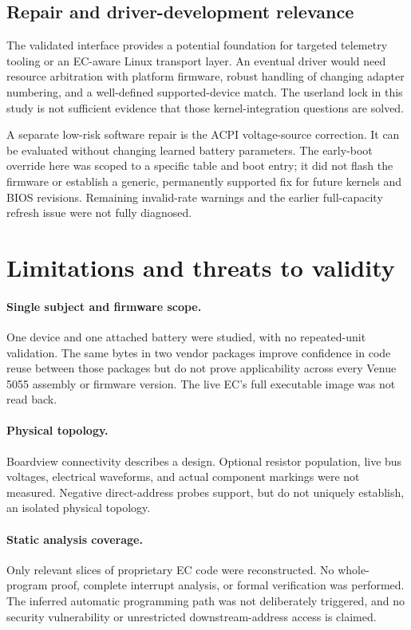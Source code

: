\documentclass[11pt,a4paper]{article}
\newcommand{\code}[1]{\texttt{\detokenize{#1}}}
\begin{document}
\subsection{Repair and driver-development relevance}
The validated interface provides a potential foundation for targeted telemetry tooling or an EC-aware Linux transport layer. An eventual driver would need resource arbitration with platform firmware, robust handling of changing adapter numbering, and a well-defined supported-device match. The userland lock in this study is not sufficient evidence that those kernel-integration questions are solved.

A separate low-risk software repair is the ACPI voltage-source correction. It can be evaluated without changing learned battery parameters. The early-boot override here was scoped to a specific table and boot entry; it did not flash the firmware or establish a generic, permanently supported fix for future kernels and BIOS revisions. Remaining invalid-rate warnings and the earlier full-capacity refresh issue were not fully diagnosed.

\section{Limitations and threats to validity}
\paragraph{Single subject and firmware scope.} One device and one attached battery were studied, with no repeated-unit validation. The same \code{@EC0} bytes in two vendor packages improve confidence in code reuse between those packages but do not prove applicability across every Venue 5055 assembly or firmware version. The live EC's full executable image was not read back.

\paragraph{Physical topology.} Boardview connectivity describes a design. Optional resistor population, live bus voltages, electrical waveforms, and actual component markings were not measured. Negative direct-address probes support, but do not uniquely establish, an isolated physical topology.

\paragraph{Static analysis coverage.} Only relevant slices of proprietary EC code were reconstructed. No whole-program proof, complete interrupt analysis, or formal verification was performed. The inferred automatic programming path was not deliberately triggered, and no security vulnerability or unrestricted downstream-address access is claimed.
\end{document}

